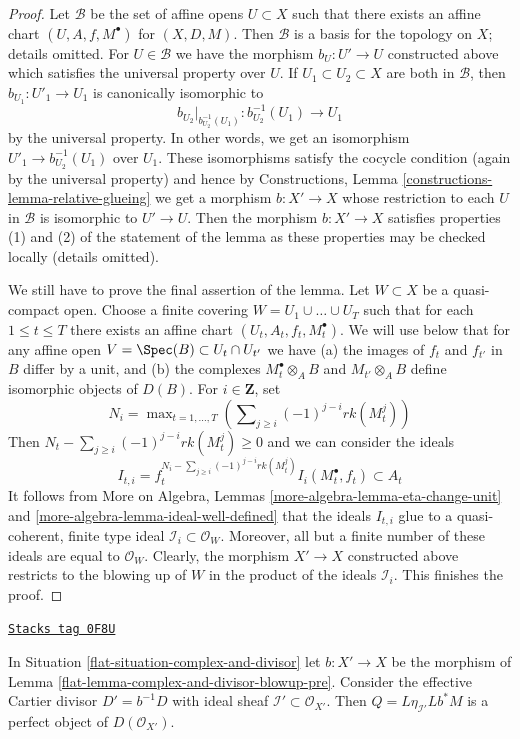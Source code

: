 \begin{proof}
\medskip\noindent
Let $\mathcal{B}$ be the set of affine opens $U \subset X$
such that there exists an affine chart $(U, A, f, M^\bullet)$
for $(X, D, M)$. Then $\mathcal{B}$ is a basis for the topology
on $X$; details omitted. For $U \in \mathcal{B}$ we have
the morphism $b_U : U' \to U$ constructed above which satisfies
the universal property over $U$. If $U_1 \subset U_2 \subset X$
are both in $\mathcal{B}$, then $b_{U_1} : U'_1 \to U_1$
is canonically isomorphic to
$$
b_{U_2}|_{b_{U_2}^{-1}(U_1)} : b_{U_2}^{-1}(U_1) \longrightarrow U_1
$$
by the universal property. In other words, we get an isomorphism
$U'_1 \to b_{U_2}^{-1}(U_1)$ over $U_1$. These isomorphisms satisfy
the cocycle condition (again by the universal property) and hence by
Constructions, Lemma \ref{constructions-lemma-relative-glueing}
we get a morphism $b : X' \to X$ whose restriction to each
$U$ in $\mathcal{B}$ is isomorphic to $U' \to U$.
Then the morphism $b : X' \to X$ satisfies properties (1) and (2)
of the statement of the lemma as these properties may be checked
locally (details omitted).

\medskip\noindent
We still have to prove the final assertion of the lemma.
Let $W \subset X$ be a quasi-compact open.
Choose a finite covering $W = U_1 \cup \ldots \cup U_T$
such that for each $1 \leq t \leq T$ there exists an affine chart
$(U_t, A_t, f_t, M_t^\bullet)$. We will use below that for any affine
open $V = \Spec(B) \subset U_t \cap U_{t'}$ we have
(a) the images of $f_t$ and $f_{t'}$ in $B$ differ by a unit, and
(b) the complexes $M_t^\bullet \otimes_A B$ and $M_{t'} \otimes_A B$
define isomorphic objects of $D(B)$. For $i \in \mathbf{Z}$, set
$$
N_i = \max\nolimits_{t = 1, \ldots, T}
\left(\sum\nolimits_{j \geq i} (-1)^{j - i} rk(M_t^j)\right)
$$
Then $N_t - \sum\nolimits_{j \geq i} (-1)^{j - i} rk(M_t^j) \geq 0$
and we can consider the ideals
$$
I_{t, i} =
f_t^{N_i - \sum\nolimits_{j \geq i} (-1)^{j - i} rk(M_t^j)}
I_i(M_t^\bullet, f_t)
\subset A_t
$$
It follows from More on Algebra, Lemmas
\ref{more-algebra-lemma-eta-change-unit} and
\ref{more-algebra-lemma-ideal-well-defined}
that the ideals $I_{t, i}$ glue to a quasi-coherent, finite type
ideal $\mathcal{I}_i \subset \mathcal{O}_W$. Moreover, all but
a finite number of these ideals are equal to $\mathcal{O}_W$.
Clearly, the morphism $X' \to X$ constructed above
restricts to the blowing up of $W$ in the product
of the ideals $\mathcal{I}_i$. This finishes the proof.
\end{proof}

\begin{lemma}
\label{flat-lemma-complex-and-divisor-blowup}
\href{https://stacks.math.columbia.edu/tag/0F8U}{\texttt{Stacks tag 0F8U}}

In Situation \ref{flat-situation-complex-and-divisor} let $b : X' \to X$
be the morphism of Lemma \ref{flat-lemma-complex-and-divisor-blowup-pre}.
Consider the effective Cartier divisor $D' = b^{-1}D$ with ideal sheaf
$\mathcal{I}' \subset \mathcal{O}_{X'}$. Then $Q = L\eta_{\mathcal{I}'}Lb^*M$
is a perfect object of $D(\mathcal{O}_{X'})$.
\end{lemma}

